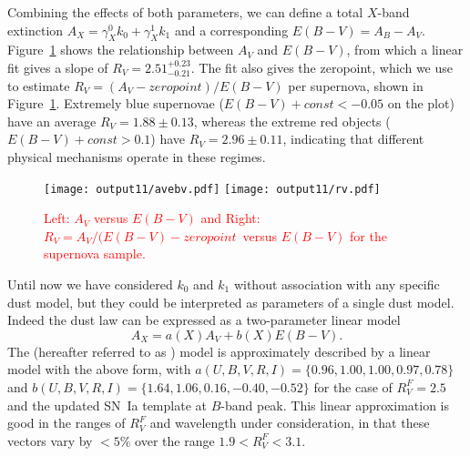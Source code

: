 \documentclass{aastex61}   	%
\begin{document}
\color{red}
Combining the effects of both parameters, we can define a total $X$-band extinction $A_X=\gamma^0_X k_0 + \gamma^1_X k_1$
and a corresponding $E(B-V) = A_B-A_V$.  Figure~\ref{avebv:fig} shows the relationship between $A_V$ and $E(B-V)$, from
which a linear fit gives a slope of $R_V=2.51^{+0.23}_{-0.21}$.  The fit also gives the zeropoint, which we use to 
estimate $R_V=(A_V-zeropoint)/E(B-V)$ per supernova, shown in Figure~\ref{avebv:fig}.
Extremely blue supernovae ($E(B-V) + const <-0.05$ on the plot) have an average $R_V=1.88 \pm   0.13$,
whereas the extreme red objects ($E(B-V) + const >0.1$) have $R_V=  2.96 \pm   0.11$, indicating that different physical mechanisms
operate in these regimes.

\begin{figure}[htbp] %
   \centering
   \texttt{[image: output11/avebv.pdf]}
   \texttt{[image: output11/rv.pdf]}
   \caption{\textcolor{red}{Left: $A_V$ versus $E(B-V)$ and Right: $R_V=A_V/(E(B-V)-zeropoint$\
   versus $E(B-V)$ for the supernova sample.}
   \label{avebv:fig}}
\end{figure}

Until now we have considered $k_0$ and $k_1$ without association with any specific dust model, but they could be interpreted as
parameters of a single  dust model.  Indeed the \citet{1989ApJ...345..245C} dust law can be expressed as a two-parameter linear model
\begin{equation}
A_X = a(X)  A_V + b(X) E(B-V).
\end{equation}
The \citet{1999PASP..111...63F} (hereafter referred to as ) model is approximately described by a linear model with
the above form, with
$a(U,B,V,R,I)=\{0.96,   1.00,   1.00,   0.97,   0.78\}$ and $b(U,B,V,R,I)=\{  1.64,   1.06,   0.16,  -0.40,  -0.52\}$ for the case of
$R^F_V=2.5$ and the updated
\citet{2007ApJ...663.1187H} SN~Ia template at $B$-band peak.  This linear approximation
is good in the ranges of $R^F_V$ and wavelength under consideration, in that these vectors vary by $<5$\% over the range $1.9<R^F_V<3.1$.
\end{document}
